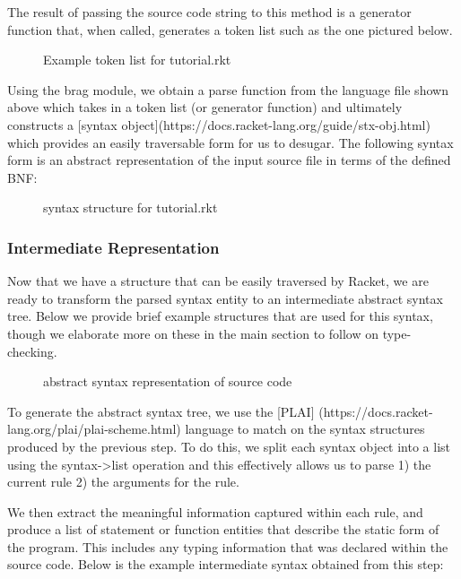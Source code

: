 The result of passing the source code string to this method is a generator function that, when called, generates a token list such as the one pictured below.

\begin{figure}[h]
  \caption[]{Example token list for tutorial.rkt}
\end{figure}

Using the brag module, we obtain a parse function from the language file shown above which takes in a token list (or generator function) and ultimately constructs a [syntax object](https://docs.racket-lang.org/guide/stx-obj.html) which provides an easily traversable form for us to desugar. The following syntax form is an abstract representation of the input source file in terms of the defined BNF: 

\begin{figure}[h]
  \caption[]{syntax structure for tutorial.rkt}
\end{figure}

\subsubsection{Intermediate Representation}
Now that we have a structure that can be easily traversed by Racket, we are ready to transform the parsed syntax entity to an intermediate abstract syntax tree. Below we provide brief example structures that are used for this syntax, though we elaborate more on these in the main section to follow on type-checking.

\begin{figure}[h]
  \caption[]{abstract syntax representation of source code}
\end{figure}

To generate the abstract syntax tree, we use the [PLAI] (https://docs.racket-lang.org/plai/plai-scheme.html) language to match on the syntax structures produced by the previous step. To do this, we split each syntax object into a list using the syntax->list operation and this effectively allows us to parse 1) the current rule 2) the arguments for the rule.

We then extract the meaningful information captured within each rule, and produce a list of statement or function entities that describe the static form of the program. This includes any typing information that was declared within the source code. Below is the example intermediate syntax obtained from this step:

